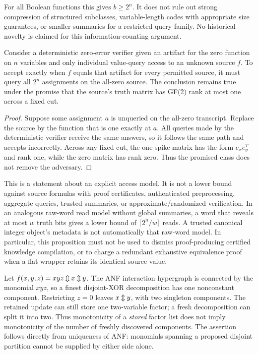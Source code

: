 For all Boolean functions this gives $b\ge2^n$. It does not rule out strong compression of structured subclasses, variable-length codes with appropriate size guarantees, or smaller summaries for a restricted query family. No historical novelty is claimed for this information-counting argument.

\begin{proposition}
Consider a deterministic zero-error verifier given an artifact for the zero function on $n$ variables and only individual value-query access to an unknown source $f$. To accept exactly when $f$ equals that artifact for every permitted source, it must query all $2^n$ assignments on the all-zero source. The conclusion remains true under the promise that the source's truth matrix has GF(2) rank at most one across a fixed cut.
\end{proposition}
\begin{proof}
Suppose some assignment $a$ is unqueried on the all-zero transcript. Replace the source by the function that is one exactly at $a$. All queries made by the deterministic verifier receive the same answers, so it follows the same path and accepts incorrectly. Across any fixed cut, the one-spike matrix has the form $e_xe_y^T$ and rank one, while the zero matrix has rank zero. Thus the promised class does not remove the adversary.
\end{proof}

This is a statement about an explicit access model. It is not a lower bound against source formulas with proof certificates, authenticated preprocessing, aggregate queries, trusted summaries, or approximate/randomized verification. In an analogous raw-word read model without global summaries, a word that reveals at most $w$ truth bits gives a lower bound of $\lceil2^n/w\rceil$ reads. A trusted canonical integer object's metadata is not automatically that raw-word model. In particular, this proposition must not be used to dismiss proof-producing certified knowledge compilation\cite{certified2025}, or to charge a redundant exhaustive equivalence proof when a flat wrapper retains its identical source value.

\begin{example}
Let $f(x,y,z)=xyz\mathbin{\Updownarrow} x\mathbin{\Updownarrow} y$. The ANF interaction hypergraph is connected by the monomial $xyz$, so a finest disjoint-XOR decomposition has one nonconstant component. Restricting $z=0$ leaves $x\mathbin{\Updownarrow} y$, with two singleton components. The retained update can still store one two-variable factor; a fresh decomposition can split it into two. Thus monotonicity of a \emph{stored} factor list does not imply monotonicity of the number of freshly discovered components. The assertion follows directly from uniqueness of ANF: monomials spanning a proposed disjoint partition cannot be supplied by either side alone.
\end{example}

